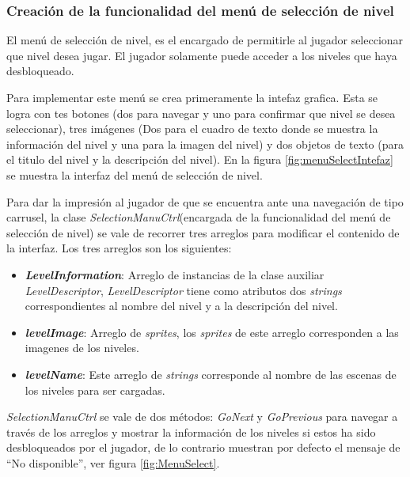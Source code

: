 \subsubsection{Creación de la funcionalidad del menú de selección de nivel}
El menú de selección de nivel, es el encargado de permitirle al jugador seleccionar que nivel desea jugar. El jugador solamente puede acceder a los niveles que haya desbloqueado. 
\\
\par
Para implementar este menú se crea primeramente la intefaz grafica. Esta se logra con tes botones (dos para navegar y uno para confirmar que nivel se desea seleccionar), tres imágenes (Dos para el cuadro de texto donde se muestra la información del nivel y una para la imagen del nivel) y dos objetos de texto (para el titulo del nivel y la descripción del nivel). En la figura \ref{fig:menuSelectIntefaz} se muestra la interfaz del menú de selección de nivel. 
\\
\par
Para dar la impresión al jugador de que se encuentra ante una navegación de tipo carrusel, la clase \textit{SelectionManuCtrl}(encargada de la funcionalidad del menú de selección de nivel) se vale de recorrer tres arreglos para modificar el contenido de la interfaz. Los tres arreglos son los siguientes:
\begin{itemize}
	\item \textit{\textbf{LevelInformation}}: Arreglo de instancias de la clase auxiliar \textit{LevelDescriptor}, \textit{LevelDescriptor} tiene como atributos dos \textit{strings} correspondientes al nombre del nivel y a la descripción del nivel.
	\item \textit{\textbf{levelImage}}: Arreglo de \textit{sprites}, los \textit{sprites} de este arreglo corresponden a las imagenes de los niveles.
	\item \textit{\textbf{levelName}}:	Este arreglo de \textit{strings} corresponde al nombre de las escenas de los niveles para ser cargadas.	
\end{itemize}  
\textit{SelectionManuCtrl} se vale de dos métodos: \textit{GoNext} y \textit{GoPrevious} para navegar a través de los arreglos y mostrar la información de los niveles si estos ha sido desbloqueados por el jugador, de lo contrario muestran por defecto el mensaje de “No disponible”, ver figura  \ref{fig:MenuSelect}.   

